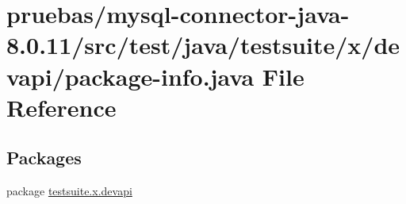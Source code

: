 \hypertarget{test_2java_2testsuite_2x_2devapi_2package-info_8java}{}\section{pruebas/mysql-\/connector-\/java-\/8.0.11/src/test/java/testsuite/x/devapi/package-\/info.java File Reference}
\label{test_2java_2testsuite_2x_2devapi_2package-info_8java}
\subsection*{Packages}
\begin{DoxyCompactItemize}
\item 
package \mbox{\hyperlink{namespacetestsuite_1_1x_1_1devapi}{testsuite.\+x.\+devapi}}
\end{DoxyCompactItemize}
